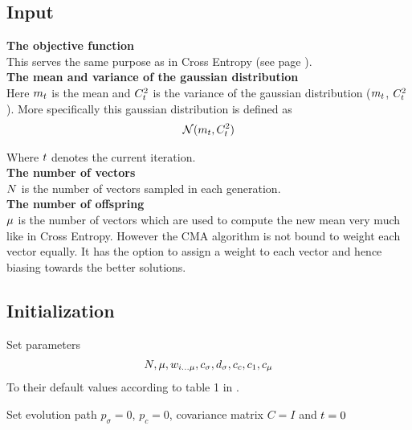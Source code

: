 
\subsection{Input}

\textbf{The objective function} \\
This serves the same purpose as in Cross Entropy (see page \pageref{CEObjective}).
\\

\textbf{The mean and variance of the gaussian distribution} \\
Here $m_{t}$ is the mean and  
$C^{2}_{t}$ is the variance 
of the gaussian distribution ($m_{t}$,
$C^2_{t}$). 
More specifically this gaussian distribution is defined as 
\begin{align*}
\mathcal{N}(m_{t},C^2_{t})
\end{align*}

Where $t$ denotes the current iteration.\\


\textbf{The number of vectors}\\
$N$ is the number of vectors sampled in each generation.
\\

\textbf{The number of offspring}\\
$\mu$ is the number of vectors which are used to compute 
the new mean very much like in Cross Entropy. However the CMA algorithm
is not bound to weight each vector equally. It has the option to assign 
a weight to each vector and hence biasing towards the better solutions.
\\


\subsection{Initialization}


Set parameters
\begin{align*}
N, \mu, w_{i \dots \mu}, c_{\sigma}, d_{\sigma}, c_c, c_1, c_{\mu}
\end{align*}
To their default values according to table 1 in \citep{hansen2011}.

Set evolution path $p_{\sigma} = 0$, $p_{c} = 0$, covariance matrix $C = I$ and $t = 0$

